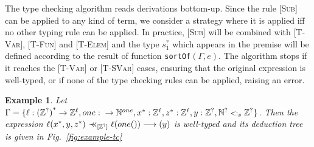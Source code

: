 \documentclass{eptcs}
\newcommand{\NN}{\ensuremath{\mathbb{N}}\xspace}
\newcommand{\ZZ}{\ensuremath{\mathbb{Z}}\xspace}
\newcommand{\match}{\mathrel{\mbox{$\prec\hspace{-0.5em}\prec$}}}
\newcommand{\TVar}{{\small \textsc{T-Var}}}
\newcommand{\TSVar}{{\small \textsc{T-SVar}}}
\newcommand{\TFun}{{\small \textsc{T-Fun}}}
\newcommand{\TElem}{{\small \textsc{T-Elem}}}
\newcommand{\Sub}{{\small \textsc{Sub}}}
\newcommand{\sub}{\mathrel{\mbox{{\footnotesize $<:$}}}}
\newcommand{\sortof}[2]{\texttt{sortOf}\ensuremath{(#1,#2)}}
\newcommand{\sig}[2]{\ensuremath{{#1}\rightarrow{#2}}}
\newcommand{\vsig}[2]{\ensuremath{{#1}^*\rightarrow{#2}}}
\newtheorem{exmp}[thm]{Example}
\begin{document}
The type checking algorithm reads derivations bottom-up. Since the rule [\Sub] can be applied
to any kind of term, we consider a strategy where it is applied iff no other
typing rule can be applied. In practice, [\Sub] will be
combined with [\TVar], [\TFun] and [\TElem] and
the type $s_1^?$ which appears in the premise will be defined
according to the result of function \sortof{\Gamma}{e}. The algorithm stops if
it reaches the [\TVar] or [\TSVar] cases, ensuring that the original expression is well-typed, or if
none of the type checking rules can be applied, raising an error.

\begin{exmp}
\label{exmp:checking}
Let $\Gamma = \{\ell : \vsig{(\ZZ^?)}{\ZZ^{\ell}}, one : \sig{}{\NN^{one}}, x^* :
\ZZ^{\ell}, z^* : \ZZ^{\ell}, y :
\ZZ^?, \NN^? \sub_s \ZZ^?\}$. Then the expression $\ell(x^*,y,z^*)
\match_{[\ZZ^?]} \ell(one())
\longrightarrow (y)$ is well-typed
and its deduction tree is given in Fig.~\ref{fig:example-tc}


\end{exmp}
\end{document}
